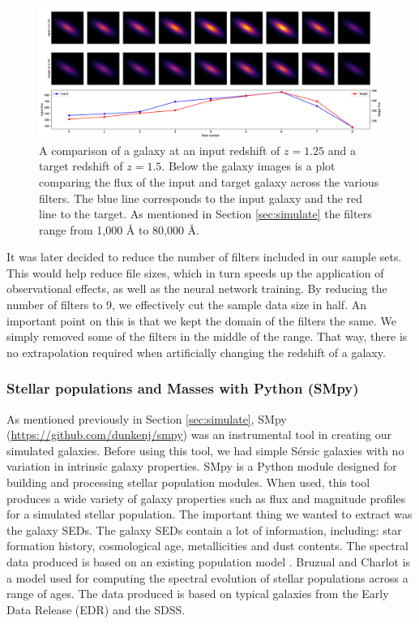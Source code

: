\documentclass[fleqn,usenatbib]{mnras}
\begin{document}
\begin{figure}
	\includegraphics[width=2\columnwidth]{Figures/galaxy-SED-v2.png}
    \caption{A comparison of a galaxy at an input redshift of $z = 1.25$ and a target redshift of $z = 1.5$. Below the galaxy images is a plot comparing the flux of the input and target galaxy across the various filters. The blue line corresponds to the input galaxy and the red line to the target. As mentioned in Section \ref{sec:simulate} the filters range from 1,000 \si{\angstrom} to 80,000 \si{\angstrom}.}
    \label{fig:galaxy-SED}
\end{figure}

It was later decided to reduce the number of filters included in our sample sets. This would help reduce file sizes, which in turn speeds up the application of observational effects, as well as the neural network training. By reducing the number of filters to 9, we effectively cut the sample data size in half. An important point on this is that we kept the domain of the filters the same. We simply removed some of the filters in the middle of the range. That way, there is no extrapolation required when artificially changing the redshift of a galaxy.

\subsubsection{Stellar populations and Masses with Python (SMpy)} \label{sec:SMPY}
As mentioned previously in Section \ref{sec:simulate}, SMpy (\url{https://github.com/dunkenj/smpy}) was an instrumental tool in creating our simulated galaxies. Before using this tool, we had simple S\'ersic galaxies with no variation in intrinsic galaxy properties. SMpy is a Python module designed for building and processing stellar population modules. When used, this tool produces a wide variety of galaxy properties such as flux and magnitude profiles for a simulated stellar population. The important thing we wanted to extract was the galaxy SEDs. The galaxy SEDs contain a lot of information, including: star formation history, cosmological age, metallicities and dust contents. The spectral data produced is based on an existing population model \citet{Bruzual2003}. Bruzual and Charlot is a model used for computing the spectral evolution of stellar populations across a range of ages. The data produced is based on typical galaxies from the Early Data Release (EDR) and the SDSS.
\end{document}
